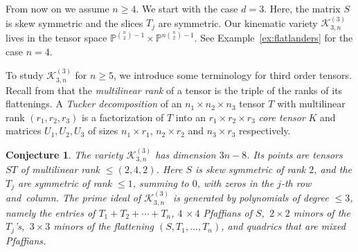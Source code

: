 \documentclass[english]{ourlematema}
\numberwithin{theorem}{section}
\newtheorem{conjecture}[theorem]{Conjecture}
\theoremstyle{definition}
\newcommand{\PP}{\mathbb{P}}
\begin{document}
 From now on we assume $n \geq 4$.
We start with the case
$d=3$. Here, the matrix $S$ is skew symmetric and the slices  $T_j$ are symmetric.
 Our kinematic variety $\mathcal{K}^{(3)}_{3,n}$ lives
 in the tensor space $\PP^{\binom{n}{2}-1} \times \PP^{n \binom{n}{2}-1}$.
 See Example~\ref{ex:flatlanders} for the case $n=4$.
 
To study $\mathcal{K}^{(3)}_{3,n}$ for $n \geq 5$, we introduce some terminology for third order tensors. 
Recall from \cite[Chapter~2]{JML} that
 the \textit{multilinear rank} of a tensor is the triple of the ranks of its  flattenings.
  A \textit{Tucker decomposition} of an $n_1 \times n_2 \times n_3$ tensor $T$ with multilinear rank $(r_1, r_2, r_3)$ is a factorization of $T$ into an $r_1 \times r_2 \times r_3$ \textit{core tensor} $K$ and matrices $U_1, U_2, U_3$ of sizes $n_1 \times r_1$, $n_2 \times r_2$ and $n_3 \times r_3$ respectively.
 
\begin{conjecture} \label{conj:d=3}
    The variety  $\mathcal{K}^{(3)}_{3,n}$ has dimension
    $3n-8$. Its points are
      tensors~$ST$ of multilinear rank $ \leq (2,4,2)$.
      Here $S$ is skew symmetric of rank $2$, and
      the $T_j$ are symmetric of rank $\leq 1$,
      summing to $0$, with zeros in the $j$-th row and~column.
      The prime ideal of  $\mathcal{K}^{(3)}_{3,n}$ is generated by polynomials
of degree $\leq 3$, namely    the entries of  $T_1 +T_2 + \cdots + T_n $,
    $4\, \times 4$ Pfaffians of $S$,
     $\,2 \times 2$ minors of the $T_j$'s, 
      $\,3 \times 3$ minors of the flattening $(S, T_1, \dots, T_n)$,
     and quadrics that are mixed Pfaffians.
     \end{conjecture}
\end{document}
